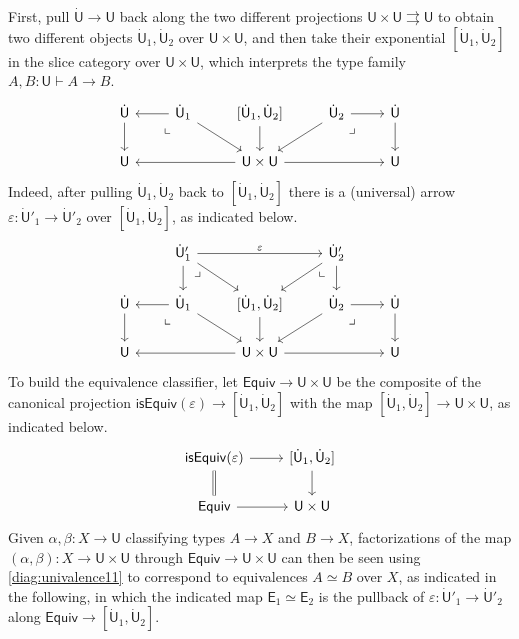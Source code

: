\documentclass[12pt,reqno]{amsart}
\renewcommand{\to}{\ensuremath{\rightarrow}}
\newcommand{\tto}{\ensuremath{\rightrightarrows}}
\newcommand{\T}{\ensuremath{\mathsf{U}}}
\newcommand{\TT}{\ensuremath{\dot{\mathsf{U}}}}
\newcommand{\pbcorner}{\arrow[dr,phantom,"\lrcorner" very near start, shift right=.5ex]} %
\newcommand{\pbcornerright}{\arrow[dl,phantom,"\llcorner" very near start, shift left=.5ex]} %
\theoremstyle{remark}
\theoremstyle{definition}
\begin{document}
First, pull $\TT \to \T$ back along the two different projections $\T \times \T \tto \T$ to obtain two different objects $\TT_1, \TT_2$ over $\T \times \T$, and then take their exponential $[\TT_1, \TT_2]$ in the slice category over ${\T \times \T}$, which interprets the type family $A, B : \T \vdash A \to B$.
\begin{equation*}\label{diag:univalence1}
\begin{tikzcd} 
	\TT \ar[d] & \TT_1 \ar[l] \ar[rd] \pbcornerright &\ar[d] [\TT_1, \TT_2] & \TT_2 \ar[ld] \ar[r] \pbcorner & \TT \ar[d] \\  
	\T && \ar[ll]  \T \times \T \ar[rr] && \T
	 \end{tikzcd}
 \end{equation*}
 Indeed, after pulling $\TT_1, \TT_2$ back to $[\TT_1, \TT_2]$ there is a (universal) arrow $\varepsilon : \TT'_1 \to \TT'_2$ over $[\TT_1, \TT_2]$, as indicated below.
 \begin{equation}\label{diag:univalence11}
\begin{tikzcd} 
& \TT'_1  \ar[d] \arrow[dr,phantom,"\lrcorner" very near start, shift right=1.5ex] \ar[rd] \ar[rr,"\varepsilon"] 
	&& \TT'_2 \ar[ld]  \arrow[dl,phantom,"\llcorner" very near start, shift left=1.5ex] \ar[d] & \\  
	\TT \ar[d] & \TT_1 \ar[l] \ar[rd] \pbcornerright &\ar[d] [\TT_1, \TT_2]& \TT_2 \ar[ld] \ar[r] \pbcorner & \TT \ar[d] \\  
	\T && \ar[ll]  \T \times \T \ar[rr] && \T
	 \end{tikzcd}
 \end{equation}
%
To build the equivalence classifier, let $\mathsf{Equiv} \to \T \times \T$ be the composite of the canonical projection $\mathsf{isEquiv}(\varepsilon) \to [\TT_1, \TT_2]$ with the map $[\TT_1, \TT_2] \to  \T \times \T$, as indicated below.
%
\begin{equation}\label{diag:univalence2}
\begin{tikzcd} 
{\mathsf{isEquiv}(\varepsilon)}  \ar[d, equals] \ar[r] & {[\TT_1, \TT_2]}  \ar[d]\\
\mathsf{Equiv} \ar[r] &  \T \times \T
 \end{tikzcd}
 \end{equation}
%
Given $\alpha, \beta : X \to \T$ classifying types $A\to X$ and $B \to X$, factorizations of the map $(\alpha, \beta) : X \to \T \times \T $ through $\mathsf{Equiv} \to \T \times \T$ can then be seen using \eqref{diag:univalence11}  to correspond to equivalences $A\simeq B$ over $X$, as indicated in the following, in which the indicated map $\mathsf{E}_1\simeq\mathsf{E}_2$ is the pullback of  $\varepsilon : \TT'_1\to \TT'_2$ along $\mathsf{Equiv}\to {[\TT_1, \TT_2]}$.
\end{document}
